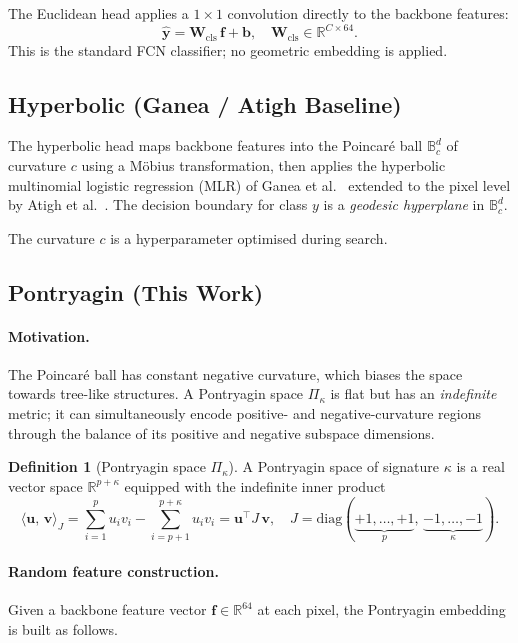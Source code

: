 \documentclass[12pt,a4paper]{article}
\newcommand{\R}{\mathbb{R}}
\newcommand{\kap}{\kappa}
\newcommand{\Jprod}[2]{\langle #1,\, #2 \rangle_J}
\theoremstyle{definition}
\newtheorem{definition}{Definition}
\begin{document}
The Euclidean head applies a $1 \times 1$ convolution directly to the
backbone features:
\[
  \hat{\mathbf{y}} = \mathbf{W}_{\text{cls}}\, \mathbf{f} + \mathbf{b},
  \quad \mathbf{W}_{\text{cls}} \in \R^{C \times 64}.
\]
This is the standard FCN classifier; no geometric embedding is applied.

\subsection{Hyperbolic (Ganea / Atigh Baseline)}

The hyperbolic head maps backbone features into the Poincaré ball
$\mathbb{B}^d_c$ of curvature $c$ using a Möbius transformation, then
applies the hyperbolic multinomial logistic regression (MLR) of
Ganea et al.~\cite{ganea2018} extended to the pixel level by Atigh et
al.~\cite{atigh2022}.  The decision boundary for class $y$ is a
\emph{geodesic hyperplane} in $\mathbb{B}^d_c$.

The curvature $c$ is a hyperparameter optimised during search.

\subsection{Pontryagin (This Work)}

\paragraph{Motivation.}
The Poincaré ball has constant negative curvature, which biases the space
towards tree-like structures.  A Pontryagin space $\Pi_\kap$ is flat but
has an \emph{indefinite} metric; it can simultaneously encode positive-
and negative-curvature regions through the balance of its positive and
negative subspace dimensions.

\begin{definition}[Pontryagin space $\Pi_\kap$]
  A Pontryagin space of signature $\kap$ is a real vector space $\R^{p+\kap}$
  equipped with the indefinite inner product
  \[
    \Jprod{\mathbf{u}}{\mathbf{v}}
    = \sum_{i=1}^{p} u_i v_i - \sum_{i=p+1}^{p+\kap} u_i v_i
    = \mathbf{u}^\top J\, \mathbf{v},
    \quad J = \mathrm{diag}(\underbrace{+1,\ldots,+1}_{p},\,
                             \underbrace{-1,\ldots,-1}_{\kap}).
  \]
\end{definition}

\paragraph{Random feature construction.}
Given a backbone feature vector $\mathbf{f} \in \R^{64}$ at each pixel, the
Pontryagin embedding is built as follows.
\end{document}
